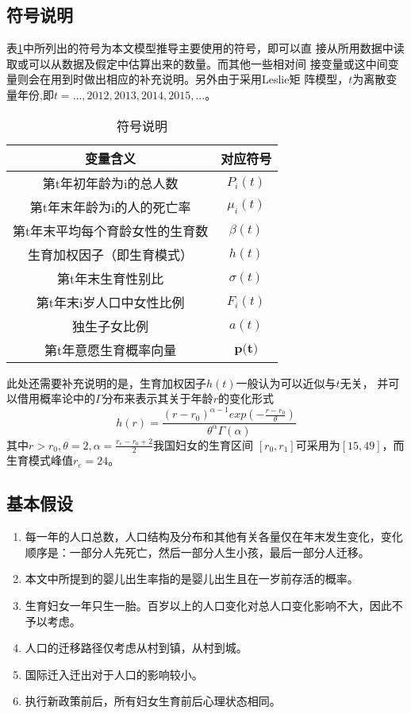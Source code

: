 \documentclass[a4paper]{article}
\begin{document}
\subsection{符号说明}
表\ref{tab:marks}中所列出的符号为本文模型推导主要使用的符号，即可以直
接从所用数据中读取或可以从数据及假定中估算出来的数量。而其他一些相对间
接变量或这中间变量则会在用到时做出相应的补充说明。另外由于采用Leslie矩
阵模型，$t$为离散变量年份,即$t=\ldots,2012,2013,2014,2015,\ldots$。
\begin{table}[h!]
\centering
\begin{tabular}{c c}
 \hline
 变量含义 & 对应符号 \\ [0.5ex]
 \hline
 第t年初年龄为i的总人数 & $P_i(t)$ \\
 第t年末年龄为i的人的死亡率 & $\mu_i(t)$ \\
 第t年末平均每个育龄女性的生育数 & $\beta(t)$ \\
 生育加权因子（即生育模式）& $h(t)$ \\
 第t年末生育性别比 & $\sigma(t)$ \\
 第t年末i岁人口中女性比例 & $F_i(t)$ \\
 独生子女比例 & $a(t)$ \\
 第t年意愿生育概率向量 & $\textbf{p(t)}$ \\ [.5ex]
 \hline
\end{tabular}
\caption{符号说明}
\label{tab:marks}
\end{table}
此处还需要补充说明的是，生育加权因子$h(t)$一般认为可以近似与$t$无关，
并可以借用概率论中的$\Gamma$分布来表示其关于年龄$r$的变化形式$$
h(r) = \frac{(r-r_0)^{\alpha-1}exp({-\frac{r-r_0}{\theta}})}{\theta^{\alpha}\Gamma(\alpha)}
$$其中$r>r_0,\theta=2,\alpha=\frac{r_e-r_0+2}{2}$我国妇女的生育区间
$[r_0,r_1]$可采用为$[15,49]$，而生育模式峰值$r_e = 24$。
\subsection{基本假设}%
\begin{enumerate}
\item 每一年的人口总数，人口结构及分布和其他有关各量仅在年末发生变化，变化顺序是：一部分人先死亡，然后一部分人生小孩，最后一部分人迁移。
\item 本文中所提到的婴儿出生率指的是婴儿出生且在一岁前存活的概率。
\item 生育妇女一年只生一胎。百岁以上的人口变化对总人口变化影响不大，因此不予以考虑。
\item 人口的迁移路径仅考虑从村到镇，从村到城。
\item 国际迁入迁出对于人口的影响较小。
\item 执行新政策前后，所有妇女生育前后心理状态相同。
\end{enumerate}
\end{document}
